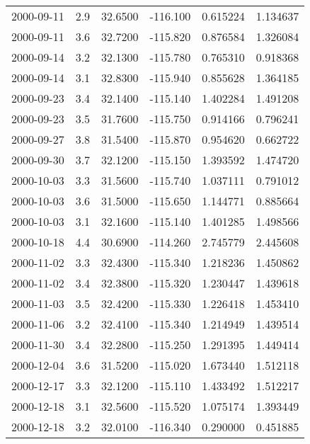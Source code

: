 \begin{tabular}{lrrrrr}
2000-09-11 &       2.9 &  32.6500 &  -116.100 &         0.615224 &         1.134637 \\
2000-09-11 &       3.6 &  32.7200 &  -115.820 &         0.876584 &         1.326084 \\
2000-09-14 &       3.2 &  32.1300 &  -115.780 &         0.765310 &         0.918368 \\
2000-09-14 &       3.1 &  32.8300 &  -115.940 &         0.855628 &         1.364185 \\
2000-09-23 &       3.4 &  32.1400 &  -115.140 &         1.402284 &         1.491208 \\
2000-09-23 &       3.5 &  31.7600 &  -115.750 &         0.914166 &         0.796241 \\
2000-09-27 &       3.8 &  31.5400 &  -115.870 &         0.954620 &         0.662722 \\
2000-09-30 &       3.7 &  32.1200 &  -115.150 &         1.393592 &         1.474720 \\
2000-10-03 &       3.3 &  31.5600 &  -115.740 &         1.037111 &         0.791012 \\
2000-10-03 &       3.6 &  31.5000 &  -115.650 &         1.144771 &         0.885664 \\
2000-10-03 &       3.1 &  32.1600 &  -115.140 &         1.401285 &         1.498566 \\
2000-10-18 &       4.4 &  30.6900 &  -114.260 &         2.745779 &         2.445608 \\
2000-11-02 &       3.3 &  32.4300 &  -115.340 &         1.218236 &         1.450862 \\
2000-11-02 &       3.4 &  32.3800 &  -115.320 &         1.230447 &         1.439618 \\
2000-11-03 &       3.5 &  32.4200 &  -115.330 &         1.226418 &         1.453410 \\
2000-11-06 &       3.2 &  32.4100 &  -115.340 &         1.214949 &         1.439514 \\
2000-11-30 &       3.4 &  32.2800 &  -115.250 &         1.291395 &         1.449414 \\
2000-12-04 &       3.6 &  31.5200 &  -115.020 &         1.673440 &         1.512118 \\
2000-12-17 &       3.3 &  32.1200 &  -115.110 &         1.433492 &         1.512217 \\
2000-12-18 &       3.1 &  32.5600 &  -115.520 &         1.075174 &         1.393449 \\
2000-12-18 &       3.2 &  32.0100 &  -116.340 &         0.290000 &         0.451885 \\

\end{tabular}
